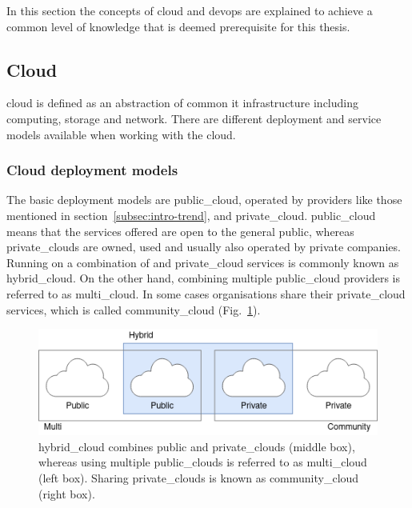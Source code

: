 \documentclass[../main.tex]{subfiles}
\begin{document}
    In this section the concepts of \gls{cloud} and \gls{devops} are explained to achieve a common level of knowledge that is deemed prerequisite for this thesis.

    \subsection{Cloud}
    \label{subsec:cloud}

    \Gls{cloud} is defined as an abstraction of common \acrshort{it} infrastructure including computing, storage and network.
    There are different deployment and service models available when working with the cloud.\cite{cloud_def_nist}

    \subsubsection{Cloud deployment models}
    \label{subsubsec:defs-cloud-depl-model}

    The basic deployment models are \gls{public_cloud}, operated by providers like those mentioned in section~\ref{subsec:intro-trend}, and \gls{private_cloud}.
    \Gls{public_cloud} means that the services offered are open to the general public, whereas \glspl{private_cloud} are owned, used and usually also operated by private companies.
    Running on a combination of  and \gls{private_cloud} services is commonly known as \gls{hybrid_cloud}.
    On the other hand, combining multiple \gls{public_cloud} providers is referred to as \gls{multi_cloud}.
    In some cases organisations share their \gls{private_cloud} services, which is called \gls{community_cloud} (Fig.~\ref{fig:cloud-models}).\cite{cloud_def_nist}

    \begin{figure}[h]
        \centering
        \includegraphics[width=.8\linewidth]{img/def_cloud_models_v2.png}
        \captionsetup{justification=centering}
        \caption{
             \Gls{hybrid_cloud}  combines public and \glspl{private_cloud} (middle box), whereas using multiple \glspl{public_cloud} is referred to as \gls{multi_cloud} (left box).
            Sharing \glspl{private_cloud} is known as \gls{community_cloud} (right box).
        }
        \label{fig:cloud-models}
    \end{figure}
\end{document}
